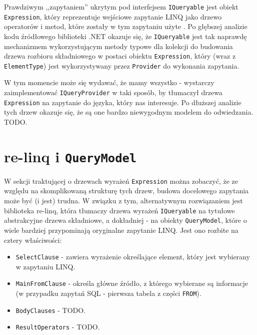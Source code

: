 Prawdziwym ,,zapytaniem'' ukrytym pod interfejsem \texttt{IQueryable} jest obiekt \texttt{Expression}, który reprezentuje wejściowe zapytanie LINQ jako drzewo operatorów i metod, które zostały w tym zapytaniu użyte \cite{linq_queryable}. Po głębszej analizie kodu źródłowego biblioteki .NET okazuje się, że \texttt{IQueryable} jest tak naprawdę mechanizmem wykorzystującym metody typowe dla kolekcji do budowania drzewa rozbioru składniowego w postaci obiektu \texttt{Expression}, który (wraz z \texttt{ElementType}) jest wykorzystywany przez \texttt{Provider} do wykonania zapytania.

W tym momencie może się wydawać, że mamy wszystko - wystarczy zaimplementować \texttt{IQueryProvider} w taki sposób, by tłumaczył drzewa \texttt{Expression} na zapytanie do języka, który nas interesuje. Po dłuższej analizie tych drzew okazuje się, że są one bardzo niewygodnym modelem do odwiedzania. TODO.

\section{re-linq i \texttt{QueryModel}}
W sekcji traktującej o drzewach wyrażeń \texttt{Expression} można zobaczyć, że ze względu na skomplikowaną strukturę tych drzew, budowa docelowego zapytania może być (i jest) trudna. W związku z tym, alternatywnym rozwiązaniem jest biblioteka re-linq, która tłumaczy drzewa wyrażeń \texttt{IQueryable} na tytułowe abstrakcyjne drzewa składniowe, a dokładniej - na obiekty \texttt{QueryModel}, które o wiele bardziej przypominają oryginalne zapytanie LINQ. Jest ono rozbite na cztery właściwości:

\begin{itemize}
\item \texttt{SelectClause} - zawiera wyrażenie określające element, który jest wybierany w zapytaniu LINQ. 
\item \texttt{MainFromClause} - określa główne źródło, z którego wybierane są informacje (w przypadku zapytań SQL - pierwsza tabela z części \texttt{FROM}).
\item \texttt{BodyClauses} - TODO.
\item \texttt{ResultOperators} - TODO.
\end{itemize}

